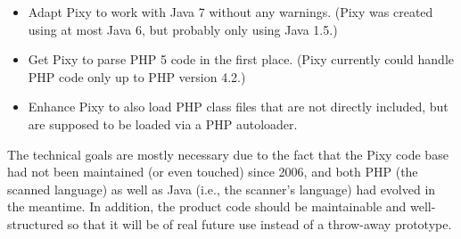 \begin{itemize}
 \item Adapt Pixy to work with Java 7 without any warnings. (Pixy was created using at most Java 6, but probably only using Java 1.5.)
 \item Get Pixy to parse PHP 5 code in the first place. (Pixy currently could handle PHP code only up to PHP version 4.2.)
 \item Enhance Pixy to also load PHP class files that are not directly included, but are supposed to be loaded via a PHP autoloader.
\end{itemize}

The technical goals are mostly necessary due to the fact that the Pixy code base had not been maintained (or even touched) since 2006, and both PHP (\ie the scanned language) as well as Java (i.e., the scanner's language) had evolved in the meantime. In addition, the product code should be maintainable and well-structured so that it will be of real future use instead of a throw-away prototype.

